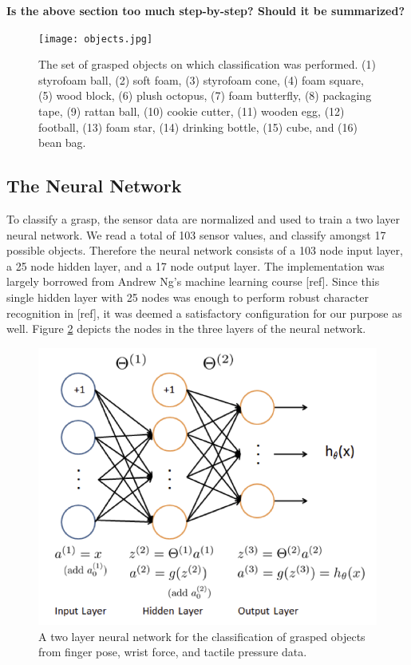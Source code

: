 \documentclass[12pt, oneside]{article}
\begin{document}
\textbf{Is the above section too much step-by-step? Should it be summarized?}

\begin{figure}[h]
\begin{center}
	\texttt{[image: objects.jpg]}
	\caption{The set of grasped objects on which classification was performed. (1) styrofoam ball, (2) soft foam, (3) styrofoam cone, (4) foam square, (5) wood block, (6) plush octopus, (7) foam butterfly, (8) packaging tape, (9) rattan ball, (10) cookie cutter, (11) wooden egg, (12) football, (13) foam star, (14) drinking bottle, (15) cube, and (16) bean bag.}
	\label{objects}
\end{center}
\end{figure}

\subsection{The Neural Network}
To classify a grasp, the sensor data are normalized and used to train a two layer neural network. We read a total of 103 sensor values, and classify amongst 17 possible objects. Therefore the neural network consists of a 103 node input layer, a 25 node hidden layer, and a 17 node output layer. The implementation was largely borrowed from Andrew Ng's machine learning course [ref]. Since this single hidden layer with 25 nodes was enough to perform robust character recognition in [ref], it was deemed a satisfactory configuration for our purpose as well. Figure \ref{nn_config} depicts the nodes in the three layers of the neural network.

\begin{figure}[h]
\begin{center}
	\includegraphics[width=.5\textwidth]{nn.png}
	\caption{A two layer neural network for the classification of grasped objects from finger pose, wrist force, and tactile pressure data.}
	\label{nn_config}
\end{center}
\end{figure}
\end{document}
